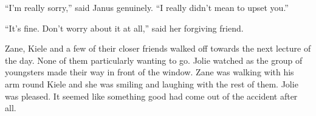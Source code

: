   ``I'm really sorry,'' said Janus genuinely.  ``I really didn't mean to upset you.''

``It's fine.  Don't worry about it at all,'' said her forgiving friend.

Zane, Kiele and a few of their closer friends walked off towards the next lecture of the day.  None of them particularly wanting to go.  Jolie watched as the group of youngsters made their way in front of the window.  Zane was walking with his arm round Kiele and she was smiling and laughing with the rest of them.  Jolie was pleased.  It seemed like something good had come out of the accident after all.





